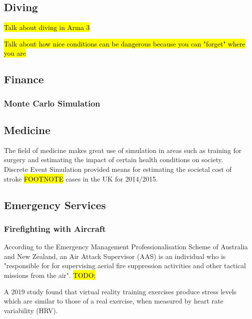\documentclass{article}
\begin{document}
\subsection{Diving}

\hl{Talk about diving in Arma 3}

\hl{Talk about how nice conditions can be dangerous because you can "forget" where you are}

\subsection{Finance}

\subsubsection{Monte Carlo Simulation}


\subsection{Medicine}


The field of medicine makes great use of simulation in areas such as training for surgery  and estimating the impact of certain health conditions on society. Discrete Event Simulation provided means for estimating the societal cost of stroke \hl{FOOTNOTE} cases in the UK for 2014/2015. \cite{afz162}

\subsection{Emergency Services}

\subsubsection{Firefighting with Aircraft}

According to the Emergency Management Professionalisation Scheme of Australia and New Zealand, an Air Attack Supervisor (AAS) is an individual who is "responsible for for supervising aerial fire suppression activities and other tactical missions from the air". \hl{TODO:}


A 2019 study found that virtual reality training exercises produce stress levels which are similar to those of a real exercise, when measured by heart rate variability (HRV). \cite{8797889}
\end{document}
